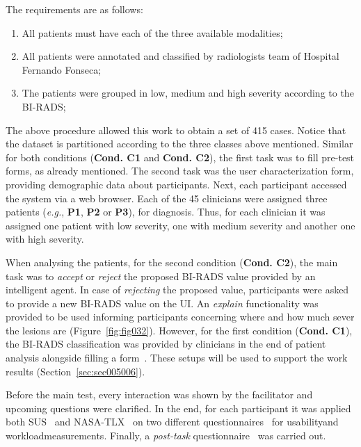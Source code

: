 \hfill

\noindent
The requirements are as follows:

\begin{enumerate}
\item All patients must have each of the three available modalities;
\item All patients were annotated and classified by radiologists team of Hospital Fernando Fonseca;
\item The patients were grouped in low, medium and high severity according to the \ac{BI-RADS};
\end{enumerate}

The above procedure allowed this work to obtain a set of 415 cases.
Notice that the dataset is partitioned according to the three classes above mentioned.
Similar for both conditions ({\bf Cond. C1} and {\bf Cond. C2}), the first task was to fill pre-test forms, as already mentioned.
The second task was the user characterization form, providing demographic data about participants.
Next, each participant accessed the system via a web browser.
Each of the 45 clinicians were assigned three patients ({\it e.g.}, {\bf P1}, {\bf P2} or {\bf P3}), for diagnosis.
Thus, for each clinician it was assigned one patient with low severity, one with medium severity and another one with high severity.

When analysing the patients, for the second condition ({\bf Cond. C2}), the main task was to {\it accept} or {\it reject} the proposed \ac{BI-RADS} value provided by an intelligent agent.
In case of {\it rejecting} the proposed value, participants were asked to provide a new \ac{BI-RADS} value on the \ac{UI}.
An {\it explain} functionality was provided to be used informing participants concerning where and how much sever the lesions are (Figure~\ref{fig:fig032}).
However, for the first condition ({\bf Cond. C1}), the \ac{BI-RADS} classification was provided by clinicians in the end of patient analysis alongside filling a form~\cite{https://doi.org/10.13140/rg.2.2.36306.86725}.
These setups will be used to support the work results (Section~\ref{sec:sec005006}).

Before the main test, every interaction was shown by the facilitator and upcoming questions were clarified.
In the end, for each participant it was applied both \ac{SUS}~\cite{Tyllinen:2016:WNN:2858036.2858570} and \ac{NASA-TLX}~\cite{ramkumar2017using, grier2015high} on two different questionnaires~\cite{https://doi.org/10.13140/rg.2.2.25301.06883, https://doi.org/10.13140/rg.2.2.26978.79044} for usability\footnotemark[21] and workload\footnotemark[22] measurements.
Finally, a {\it post-task} questionnaire~\cite{https://doi.org/10.13140/rg.2.2.16566.14403/1} was carried out.

